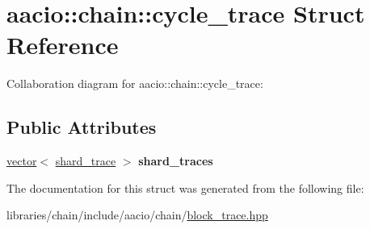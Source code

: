 \hypertarget{structaacio_1_1chain_1_1cycle__trace}{}\section{aacio\+:\+:chain\+:\+:cycle\+\_\+trace Struct Reference}
\label{structaacio_1_1chain_1_1cycle__trace}


Collaboration diagram for aacio\+:\+:chain\+:\+:cycle\+\_\+trace\+:
\subsection*{Public Attributes}
\begin{DoxyCompactItemize}
\item 
\mbox{\label{structaacio_1_1chain_1_1cycle__trace_ac9afd1a065c0a987549889e734b16e26}} 
\mbox{\hyperlink{classstd_1_1vector}{vector}}$<$ \mbox{\hyperlink{structaacio_1_1chain_1_1shard__trace}{shard\+\_\+trace}} $>$ {\bfseries shard\+\_\+traces}
\end{DoxyCompactItemize}


The documentation for this struct was generated from the following file\+:\begin{DoxyCompactItemize}
\item 
libraries/chain/include/aacio/chain/\mbox{\hyperlink{block__trace_8hpp}{block\+\_\+trace.\+hpp}}\end{DoxyCompactItemize}
